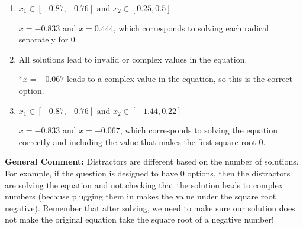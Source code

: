 \documentclass{extbook}[14pt]
\begin{document}
\begin{enumerate}
{\begin{enumerate}[label=\Alph*.]
$x = -0.600$, which corresponds to squaring each square root separately and assigning the negative to the third term.
\item \( x_1 \in [-0.87, -0.76] \text{ and } x_2 \in [0.25,0.5] \)

$x = -0.833$ and $x = 0.444$, which corresponds to solving each radical separately for 0.
\item \( \text{All solutions lead to invalid or complex values in the equation.} \)

*$x = -0.067$ leads to a complex value in the equation, so this is the correct option.
\item \( x_1 \in [-0.87, -0.76] \text{ and } x_2 \in [-1.44,0.22] \)

$x = -0.833$ and $x = -0.067$, which corresponds to solving the equation correctly and including the value that makes the first square root 0.
\end{enumerate}

\textbf{General Comment:} Distractors are different based on the number of solutions. For example, if the question is designed to have 0 options, then the distractors are solving the equation and not checking that the solution leads to complex numbers (because plugging them in makes the value under the square root negative). Remember that after solving, we need to make sure our solution does not make the original equation take the square root of a negative number!
}
\end{enumerate}
\end{document}
